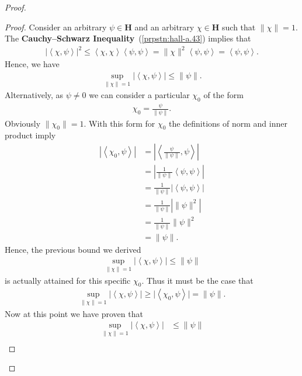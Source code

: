 \begin{proof}
\begin{proof}
Consider an arbitrary $\psi \in \mathbf{H}$ and an arbitrary $\chi \in \mathbf{H}$ such that $\|\chi\| = 1$. The \textbf{Cauchy–Schwarz Inequality}~(\ref{prpstn:hall-a.43}) implies that
\begin{align}
    \lvert \left< \chi, \psi \right> \rvert^2 \le \left< \chi, \chi \right> \left< \psi, \psi \right> = \|\chi\|^2 \left< \psi, \psi \right> = \left< \psi, \psi \right>.
\end{align}
Hence, we have
\begin{align}
    \sup\limits_{\|\chi\| = 1} \lvert \left< \chi, \psi \right> \rvert \le \|\psi\|.
\end{align}
Alternatively, as $\psi \neq 0$ we can consider a particular $\chi_0$ of the form
\begin{align}
    \chi_0 = \frac{\psi}{\|\psi\|}.
\end{align}
Obviously $\|\chi_0\| = 1$. With this form for $\chi_0$ the definitions of norm and inner product imply
\begin{align}
    \left\lvert \left< \chi_0, \psi \right> \right\rvert &= \left\lvert \left< \frac{\psi}{\|\psi\|}, \psi \right> \right\rvert \\
                                            &= \left\lvert \frac{1}{\|\psi\|} \left< \psi, \psi \right> \right\rvert \\
                                            &= \frac{1}{\|\psi\|} \left\lvert \left< \psi, \psi \right> \right\rvert \\
                                            &= \frac{1}{\|\psi\|} \left\lvert \|\psi\|^2 \right\rvert \\
                                            &= \frac{1}{\|\psi\|} \|\psi\|^2 \\
                                            &= \|\psi\|.
\end{align}
Hence, the previous bound we derived
\begin{align}
    \sup\limits_{\|\chi\| = 1} \lvert \left< \chi, \psi \right> \rvert \le \|\psi\|
\end{align}
is actually attained for this specific $\chi_0$. Thus it must be the case that
\begin{align}
    \sup\limits_{\|\chi\| = 1} \lvert \left< \chi, \psi \right> \rvert \ge \lvert \left< \chi_0, \psi \right> \rvert = \|\psi\|.
\end{align}
Now at this point we have proven that
\begin{align}
    \sup\limits_{\|\chi\| = 1} \lvert \left< \chi, \psi \right> \rvert &\le \|\psi\| \\

\end{align}
\end{proof}
\end{proof}
